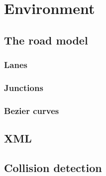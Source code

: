 
\section{Environment}
\label{sec:environment}

\subsection{The road model}
\label{sec:roadModel}

\subsubsection{Lanes}
\label{sec:lanes}

\subsubsection{Junctions}
\label{sec:junctions}


\subsubsection{Bezier curves}


\subsection{XML}
\label{sec:XML}


\subsection{Collision detection}
